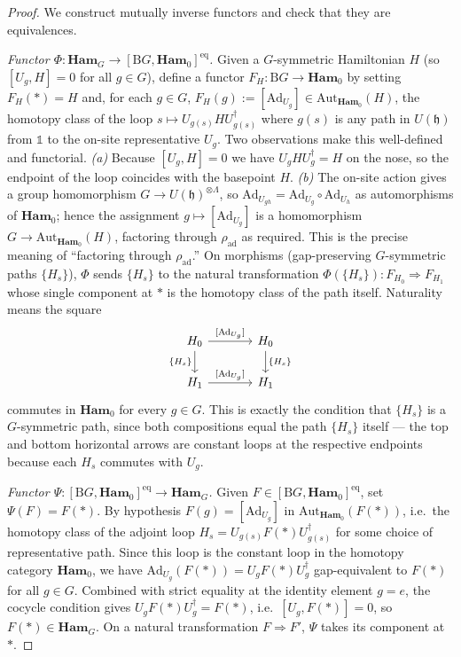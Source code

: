 \documentclass[12pt]{article}
\theoremstyle{plain}
\theoremstyle{definition}
\theoremstyle{remark}
\newcommand{\Ham}{\mathbf{Ham}}
\newcommand{\BG}{\mathrm{B}G}
\begin{document}
\begin{proof}
We construct mutually inverse functors and check that they are equivalences.

\emph{Functor $\Phi:\Ham_{G}\to[\BG,\Ham_{0}]^{\mathrm{eq}}$.}
Given a $G$-symmetric Hamiltonian $H$ (so $[U_{g},H]=0$ for all $g\in G$), define a
functor $F_{H}:\BG\to\Ham_{0}$ by setting $F_{H}(\ast)=H$ and, for each $g\in G$,
$F_{H}(g):=[\mathrm{Ad}_{U_{g}}]\in\mathrm{Aut}_{\Ham_{0}}(H)$, the homotopy class of
the loop $s\mapsto U_{g(s)}HU_{g(s)}^{\dagger}$ where $g(s)$ is any path in
$U(\mathfrak{h})$ from $\mathbb{1}$ to the on-site representative $U_{g}$. Two
observations make this well-defined and functorial.
\emph{(a)} Because $[U_{g},H]=0$ we have $U_{g}HU_{g}^{\dagger}=H$ on the nose, so the
endpoint of the loop coincides with the basepoint $H$. \emph{(b)} The on-site action
gives a group homomorphism $G\to U(\mathfrak{h})^{\otimes\Lambda}$, so
$\mathrm{Ad}_{U_{gh}}=\mathrm{Ad}_{U_{g}}\circ\mathrm{Ad}_{U_{h}}$ as automorphisms of
$\Ham_{0}$; hence the assignment $g\mapsto[\mathrm{Ad}_{U_{g}}]$ is a homomorphism
$G\to\mathrm{Aut}_{\Ham_{0}}(H)$, factoring through $\rho_{\mathrm{ad}}$ as required.
This is the precise meaning of ``factoring through $\rho_{\mathrm{ad}}$.''
On morphisms (gap-preserving $G$-symmetric paths $\{H_{s}\}$), $\Phi$ sends $\{H_{s}\}$
to the natural transformation $\Phi(\{H_{s}\}):F_{H_{0}}\Rightarrow F_{H_{1}}$ whose
single component at $\ast$ is the homotopy class of the path itself. Naturality means
the square
\[
\begin{tikzcd}[column sep=large]
H_{0} \arrow[r,"{[\mathrm{Ad}_{U_{g}}]}"] \arrow[d,"\{H_{s}\}"'] & H_{0} \arrow[d,"\{H_{s}\}"] \\
H_{1} \arrow[r,"{[\mathrm{Ad}_{U_{g}}]}"] & H_{1}
\end{tikzcd}
\]
commutes in $\Ham_{0}$ for every $g\in G$. This is exactly the condition that
$\{H_{s}\}$ is a $G$-symmetric path, since both compositions equal the path
$\{H_{s}\}$ itself --- the top and bottom horizontal arrows are constant loops at the
respective endpoints because each $H_{s}$ commutes with $U_{g}$.

\emph{Functor $\Psi:[\BG,\Ham_{0}]^{\mathrm{eq}}\to\Ham_{G}$.}
Given $F\in[\BG,\Ham_{0}]^{\mathrm{eq}}$, set $\Psi(F)=F(\ast)$. By hypothesis $F(g)=
[\mathrm{Ad}_{U_{g}}]$ in $\mathrm{Aut}_{\Ham_{0}}(F(\ast))$, i.e.\ the homotopy class
of the adjoint loop $H_{s}=U_{g(s)}F(\ast)U_{g(s)}^{\dagger}$ for some choice of
representative path. Since this loop is the constant loop in the homotopy category
$\Ham_{0}$, we have $\mathrm{Ad}_{U_{g}}(F(\ast))=U_{g}F(\ast)U_{g}^{\dagger}$
gap-equivalent to $F(\ast)$ for all $g\in G$. Combined with strict equality at the
identity element $g=e$, the cocycle condition gives
$U_{g}F(\ast)U_{g}^{\dagger}=F(\ast)$, i.e.\ $[U_{g},F(\ast)]=0$, so
$F(\ast)\in\Ham_{G}$. On a natural transformation $F\Rightarrow F'$, $\Psi$ takes
its component at $\ast$.


\end{proof}
\end{document}
